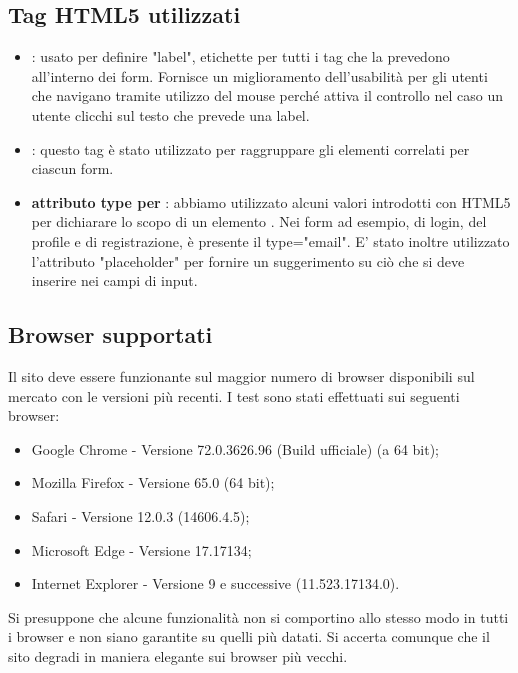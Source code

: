 \documentclass[12pt]{article}
\begin{document}
	\subsection{Tag HTML5 utilizzati}
	\begin{itemize}
		\item \textbf{}: usato per definire "label", etichette per tutti i tag che la prevedono all'interno dei form. Fornisce un miglioramento dell'usabilità per gli utenti che navigano tramite utilizzo del mouse perché attiva il controllo nel caso un utente clicchi sul testo che prevede una label.
		\item \textbf{}: questo tag è stato utilizzato per raggruppare gli elementi correlati per ciascun form.
		\item \textbf{attributo type per }: abbiamo utilizzato alcuni valori introdotti con HTML5 per dichiarare lo scopo di un elemento . Nei form ad esempio, di login, del profile e di registrazione, è presente il type="email".
		E' stato inoltre utilizzato l'attributo "placeholder" per fornire un suggerimento su ciò che si deve inserire nei campi di input.
	\end{itemize}
	\subsection{Browser supportati}
	Il sito deve essere funzionante sul maggior numero di browser disponibili sul mercato con le versioni più recenti. I test sono stati effettuati sui seguenti browser:
		\begin{itemize}
			\item Google Chrome - Versione 72.0.3626.96 (Build ufficiale) (a 64 bit);
			\item Mozilla Firefox - Versione 65.0 (64 bit);
			\item Safari - Versione 12.0.3 (14606.4.5);
			\item Microsoft Edge - Versione 17.17134;
			\item Internet Explorer - Versione 9 e successive (11.523.17134.0).
		\end{itemize}
	Si presuppone che alcune funzionalità non si comportino allo stesso modo in tutti i browser e non siano garantite su quelli più datati. Si accerta comunque che il sito degradi in	maniera elegante sui browser più vecchi.
\end{document}
